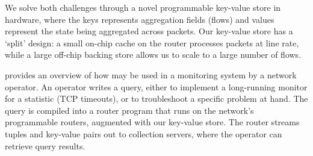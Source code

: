We solve both challenges through a novel programmable key-value store in
hardware, where the keys represents aggregation fields (\eg flows) and values
represent the state being aggregated across packets. Our key-value store has a
`split' design: a small on-chip cache on the router processes packets at line
rate, while a large off-chip backing store allows us to scale to a large number
of flows.

 provides an overview of how \TheSystem may be used in a
monitoring system by a network operator. An operator writes a \TheSystem query,
either to implement a long-running monitor for a statistic (\eg TCP timeouts),
or to troubleshoot a specific problem at hand. The query is compiled into a
router program that runs on the network's programmable routers, augmented with
our key-value store. The router streams tuples and key-value pairs out to
collection servers, where the operator can retrieve query results.
